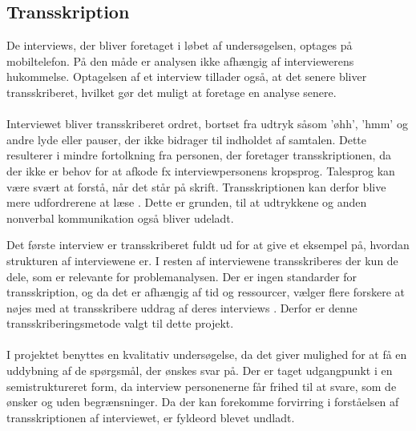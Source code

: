 \subsection{Transskription}
De interviews, der bliver foretaget i løbet af undersøgelsen, optages på mobiltelefon. På den måde er analysen ikke afhængig af interviewerens hukommelse. Optagelsen af et interview tillader også, at det senere bliver transskriberet, hvilket gør det muligt at foretage en analyse senere. 
\\\\
Interviewet bliver transskriberet ordret, bortset fra udtryk såsom 'øhh', 'hmm' og andre lyde eller pauser, der ikke bidrager til indholdet af samtalen. Dette resulterer i mindre fortolkning fra personen, der foretager transskriptionen, da der ikke er behov for at afkode fx interviewpersonens kropsprog. Talesprog kan være svært at forstå, når det står på skrift. Transskriptionen kan derfor blive mere udfordrerene at læse \citep{kvale2015}. Dette er grunden, til at udtrykkene og anden nonverbal kommunikation også bliver udeladt. 
\par
Det første interview er transskriberet fuldt ud for at give et eksempel på, hvordan strukturen af interviewene er. I resten af interviewene transskriberes der kun de dele, som er relevante for problemanalysen. Der er ingen standarder for transskription, og da det er afhængig af tid og ressourcer, vælger flere forskere at nøjes med at transskribere uddrag af deres interviews \citep{brinkmann2014}\citep{kvale2015}. Derfor er denne transskriberingsmetode valgt til dette projekt.
\\\\
I projektet benyttes en kvalitativ undersøgelse, da det giver mulighed for at få en uddybning af de spørgsmål, der ønskes svar på. Der er taget udgangpunkt i en semistruktureret form, da interview personenerne får frihed til at svare, som de ønsker og uden begrænsninger. Da der kan forekomme forvirring i forståelsen af transskriptionen af interviewet, er fyldeord blevet undladt.

